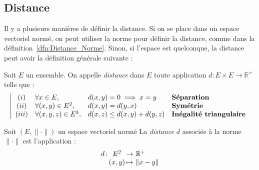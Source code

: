 \documentclass[11pt,a4paper,fleqn,pdftex]{report}
\begin{document}
\subsection{Distance} %
\label{sub:distance}
Il y a plusieurs manières de définir la distance. Si on se place dans un espace vectoriel normé, on peut utiliser la norme pour définir la distance, comme dans la définition~\ref{dfn:Distance_Norme}. Sinon, si l'espace est quelconque, la distance peut avoir la définition générale suivante : 
\begin{dfn}
Soit $E$ un ensemble. On appelle \emph{distance} dans $E$ toute application $d : E\times E \to \mathbb{R}^+$ telle que :
     \begin{equation}
        \left| 
        \begin{array}{c l l l}
        (i)&\forall x \in E,& d(x,y)=0 \implies x=y &\textbf{Séparation}\\
        (ii)&\forall (x,y) \in E^2,& d(x,y) = d(y,x) &\textbf{Symétrie}\\
        (iii)&\forall (x,y,z) \in E^3,& d(x,z)\le d(x,y)+d(y,z)&\textbf{Inégalité triangulaire}\\
        \end{array}
        \right.
        \end{equation}
\end{dfn}
\begin{dfn}\label{dfn:Distance_Norme}
     Soit $(E,\| \cdot \|)$ un espace vectoriel normé\newline
     La \emph{distance} $d$ associée à la norme $\| \cdot \|$ est l'application :
     \begin{equation}
     \begin{array}{r @{\,}c@{\,} c @{\,}c@{\,} @{\,} l}
     d &: &E^2 &\to &\mathbb{R}^+ \\
        & &(x,y) &\mapsto & \| x - y \| 
        \end{array}
     \end{equation}
\end{dfn}
\end{document}
